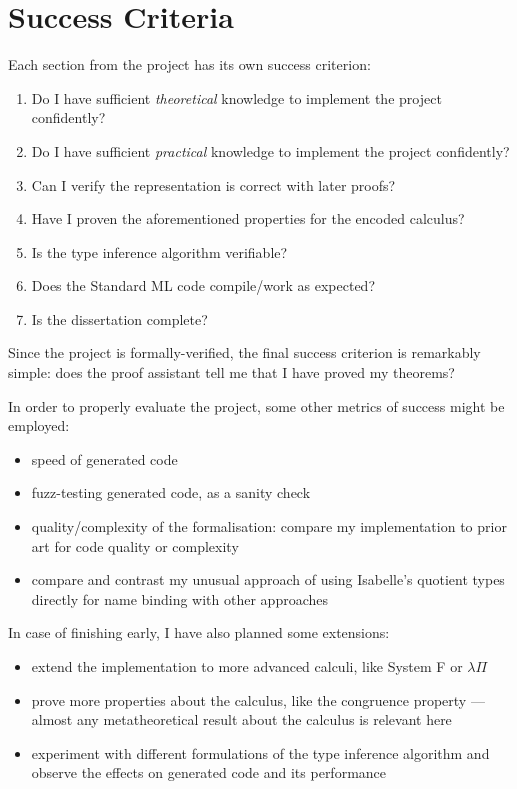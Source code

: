 \documentclass[12pt]{article}
\begin{document}
\section*{Success Criteria}
Each section from the project has its own success criterion:
\begin{enumerate}
\item
Do I have sufficient \emph{theoretical} knowledge to implement the project confidently?
\item
Do I have sufficient \emph{practical} knowledge to implement the project confidently?
\item
Can I verify the representation is correct with later proofs?
\item
Have I proven the aforementioned properties for the encoded calculus?
\item
Is the type inference algorithm verifiable?
\item
Does the Standard ML code compile/work as expected?
\item
Is the dissertation complete?
\end{enumerate}
Since the project is formally-verified, the final success criterion is remarkably simple: does the proof assistant tell me that I have proved my theorems?

In order to properly evaluate the project, some other metrics of success might be employed:
\begin{itemize}
\item
speed of generated code
\item
fuzz-testing generated code, as a sanity check
\item
quality/complexity of the formalisation: compare my implementation to prior art for code quality or complexity
\item
compare and contrast my unusual approach of using Isabelle's quotient types directly for name binding with other approaches
\end{itemize}

In case of finishing early, I have also planned some extensions:
\begin{itemize}
\item
extend the implementation to more advanced calculi, like System F or \(\lambda\Pi\)
\item
prove more properties about the calculus, like the congruence property --- almost any metatheoretical result about the calculus is relevant here
\item
experiment with different formulations of the type inference algorithm and observe the effects on generated code and its performance
\end{itemize}
\end{document}
